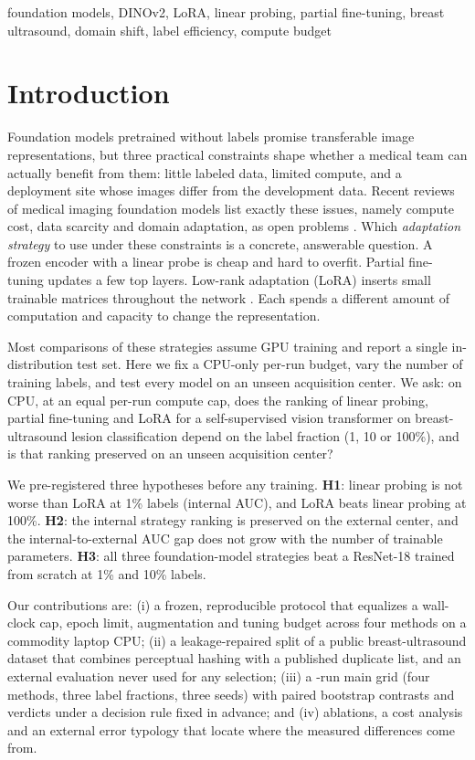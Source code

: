 \documentclass[conference,a4paper]{IEEEtran}
\begin{document}
\begin{IEEEkeywords}
foundation models, DINOv2, LoRA, linear probing, partial fine-tuning, breast
ultrasound, domain shift, label efficiency, compute budget
\end{IEEEkeywords}

\section{Introduction}
\label{sec:intro}

Foundation models pretrained without labels promise transferable image
representations, but three practical constraints shape whether a medical team
can actually benefit from them: little labeled data, limited compute, and a
deployment site whose images differ from the development data. Recent reviews of
medical imaging foundation models list exactly these issues, namely compute
cost, data scarcity and domain adaptation, as open problems \cite{niu2026review}.
Which \emph{adaptation strategy} to use under these constraints is a concrete,
answerable question. A frozen encoder with a linear probe is cheap and hard to
overfit. Partial fine-tuning updates a few top layers. Low-rank adaptation
(LoRA) inserts small trainable matrices throughout the network \cite{hu2021lora}.
Each spends a different amount of computation and capacity to change the
representation.

Most comparisons of these strategies assume GPU training and report a single
in-distribution test set. Here we fix a CPU-only per-run budget, vary the number
of training labels, and test every model on an unseen acquisition center. We
ask: on CPU, at an equal per-run compute cap, does the ranking of linear
probing, partial fine-tuning and LoRA for a self-supervised vision transformer
on breast-ultrasound lesion classification depend on the label fraction (1, 10
or 100\%), and is that ranking preserved on an unseen acquisition center?

We pre-registered three hypotheses before any training. \textbf{H1}: linear
probing is not worse than LoRA at 1\% labels (internal AUC), and LoRA beats
linear probing at 100\%. \textbf{H2}: the internal strategy ranking is preserved
on the external center, and the internal-to-external AUC gap does not grow with
the number of trainable parameters. \textbf{H3}: all three foundation-model
strategies beat a ResNet-18 trained from scratch at 1\% and 10\% labels.

Our contributions are: (i) a frozen, reproducible protocol that equalizes a
wall-clock cap, epoch limit, augmentation and tuning budget across four methods
on a commodity laptop CPU; (ii) a leakage-repaired split of a public
breast-ultrasound dataset that combines perceptual hashing with a published
duplicate list, and an external evaluation never used for any selection; (iii) a
\valRunsMain-run main grid (four methods, three label fractions, three seeds)
with paired bootstrap contrasts and verdicts under a decision rule fixed in
advance; and (iv) ablations, a cost analysis and an external error typology that
locate where the measured differences come from.
\end{document}
